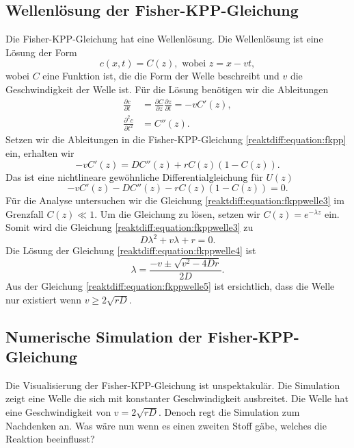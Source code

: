 \subsection{Wellenlösung der Fisher-KPP-Gleichung
\label{reaktdiff:subsection:fkppwelle}}
Die Fisher-KPP-Gleichung hat eine Wellenlösung.
Die Wellenlösung ist eine Lösung der Form
\begin{equation}
\label{reaktdiff:equation:fkppwelle}
c(x,t) = C(z), \text{ wobei } z = x - vt,
\end{equation}
wobei \(C\) eine Funktion ist, die die Form der Welle beschreibt und \(v\) die Geschwindigkeit der Welle ist.
Für die Lösung benötigen wir die Ableitungen
\begin{align*}
\frac{\partial c}{\partial t} &= \frac{\partial C}{\partial z}\frac{\partial z}{\partial t} = -vC'(z),
\\
\frac{\partial^2 c}{\partial t^2} &= C''(z).
\end{align*}
Setzen wir die Ableitungen in die Fisher-KPP-Gleichung \ref{reaktdiff:equation:fkpp} ein, erhalten wir
\begin{equation}
\label{reaktdiff:equation:fkppwelle2}
-vC'(z) = D C''(z) + rC(z)(1-C(z)).
\end{equation}
Das ist eine nichtlineare gewöhnliche Differentialgleichung für \(U(z)\)
\begin{equation}
    \label{reaktdiff:equation:fkppwelle3}
    -vC'(z) - D C''(z) - rC(z)(1-C(z)) = 0.
\end{equation}
Für die Analyse untersuchen wir die Gleichung \ref{reaktdiff:equation:fkppwelle3} im Grenzfall \(C(z) \ll 1\).
Um die Gleichung zu lösen, setzen wir \(C(z) = e^{-\lambda z}\) ein.
Somit wird die Gleichung \ref{reaktdiff:equation:fkppwelle3} zu
\begin{equation}
\label{reaktdiff:equation:fkppwelle4}
D\lambda^2 + v\lambda + r = 0.
\end{equation}
Die Lösung der Gleichung \ref{reaktdiff:equation:fkppwelle4} ist
\begin{equation}
\label{reaktdiff:equation:fkppwelle5}
\lambda = \frac{-v \pm \sqrt{v^2 - 4Dr}}{2D}.
\end{equation}
Aus der Gleichung \ref{reaktdiff:equation:fkppwelle5} ist ersichtlich, dass die Welle nur existiert wenn \(v \ge 2\sqrt{rD}\).

\subsection{Numerische Simulation der Fisher-KPP-Gleichung
\label{reaktdiff:subsection:fkppsimulation}}
Die Visualisierung der Fisher-KPP-Gleichung ist unspektakulär.
Die Simulation zeigt eine Welle die sich mit konstanter Geschwindigkeit ausbreitet.
Die Welle hat eine Geschwindigkeit von \(v = 2\sqrt{rD}\).
Denoch regt die Simulation zum Nachdenken an.
Was wäre nun wenn es einen zweiten Stoff gäbe, welches die Reaktion beeinflusst?

